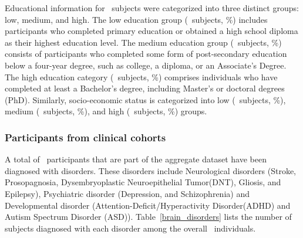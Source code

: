Educational information for \TotalSubjectsWithEducationCount\ subjects were categorized into three distinct groups: low, medium, and high. 
The low education group (\TotalSubjectsWithLowEducationCount\ subjects, \TotalSubjectsWithLowEducationPercentage\%) includes participants 
who completed primary education or obtained a high school diploma as their highest education level. 
The medium education group (\TotalSubjectsWithMediumEducationCount\ subjects, \TotalSubjectsWithMediumEducationPercentage\%) consists 
of participants who completed some form of post-secondary education below a four-year degree, such as college, a diploma, or an Associate's Degree. 
The high education category (\TotalSubjectsWithHighEducationCount\ subjects, \TotalSubjectsWithHighEducationPercentage\%) comprises individuals 
who have completed at least a Bachelor's degree, including Master's or doctoral degrees (PhD). 
Similarly, socio-economic status is categorized into low (\TotalSubjectsWithLowEconomicCount\ subjects, \TotalSubjectsWithLowEconomicPercentage\%), 
medium (\TotalSubjectsWithMediumEconomicCount\ subjects, \TotalSubjectsWithMediumEconomicPercentage\%), and high (\TotalSubjectsWithHighEconomicCount\ subjects, 
\TotalSubjectsWithHighEconomicPercentage\%) groups.



\subsubsection{Participants from clinical cohorts}

A total of \TotalSubjectsWithDisordersCount\ participants that are part of the aggregate dataset have been diagnosed with disorders.
These disorders include Neurological disorders (Stroke, Prosopagnosia, Dysembryoplastic Neuroepithelial Tumor(DNT), Gliosis, and Epilepsy), Psychiatric disorder (Depression, and Schizophrenia)
and Developmental disorder (Attention-Deficit/Hyperactivity Disorder(ADHD) and Autism Spectrum Disorder (ASD)). 
Table~\ref{brain_disorders} lists the number of subjects diagnosed with each disorder among 
the overall \TotalSubjectsIncludedAfterInspectionCount\ individuals. 


